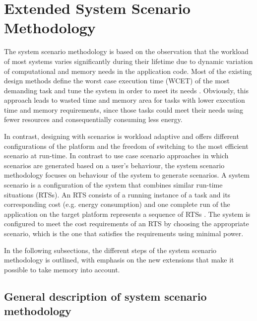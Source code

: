 \section{Extended System Scenario Methodology}
\label{sec:methodology}

The system scenario methodology is based on the observation that the workload of most systems varies significantly during their lifetime due to dynamic variation of computational and memory needs in the application code. Most of the existing design methods define the worst case execution time (WCET)  of the most demanding task and tune the system in order to meet its needs \cite{tcm}. Obviously, this approach leads to wasted time and memory area for tasks with lower execution time and memory requirements, since those tasks could meet their needs using fewer resources and consequentially consuming less energy. 

In contrast, designing with scenarios is workload adaptive and offers different configurations of the platform and the freedom of switching to the most efficient scenario at run-time. In contrast to use case scenario approaches in which scenarios are generated based on a user's behaviour, the system scenario methodology focuses on behaviour of the system to generate scenarios. A system scenario is a configuration of the system that combines similar run-time situations (RTSs). An RTS consists of a running instance of a task and its corresponding cost (e.g. energy consumption) and one complete run of the application on the target platform represents a sequence of RTSs \cite{Elena2010}. The system is configured to meet the cost requirements of an RTS by choosing the appropriate scenario, which is the one that satisfies the requirements using minimal power.

In the following subsections, the different steps of the system scenario methodology is outlined, with emphasis on the new extensions that make it possible to take memory into account. 

\subsection{General description of system scenario methodology}

